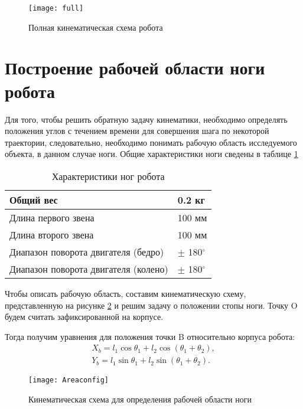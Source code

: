 \begin{figure}[h!]
	\begin{center}
		\texttt{[image: full]}
		\caption{Полная кинематическая схема робота}
		\label{full}
	\end{center}
\end{figure}

\section{Построение рабочей области ноги робота}\label{C2_2}
Для того, чтобы решить обратную задачу кинематики, необходимо определять положения углов с течением времени для совершения шага по некоторой траектории, следовательно, необходимо понимать рабочую область исследуемого объекта, в данном случае ноги. Общие характеристики ноги сведены в таблице \ref{tablParam}


\begin{table}[h]
	\begin{center}
		\caption{Характеристики ног робота}
		\label{tablParam}
		\begin{tabular}{| l | l |}
			\hline
			Общий вес   &    0.2 кг \\ \hline
			Длина первого звена & 100 мм\\ \hline
			Длина второго звена & 100 мм \\ \hline
			Диапазон поворота двигателя (бедро) & $\pm$ 180$^{\circ}$ \\ \hline
			Диапазон поворота двигателя (колено) & $\pm$ 180$^{\circ}$ \\ \hline
		\end{tabular}
	\end{center}
\end{table}

Чтобы описать рабочую область, составим кинематическую схему, представленную на рисунке \ref{Areaconfig} и решим задачу о положении стопы ноги. Точку O будем считать зафиксированной на корпусе. 

Тогда получим уравнения для положения точки B относительно корпуса робота:
\begin{equation}
\begin{array}{l}
	X_{b} = l_{1}\cos{\theta_1}+l_{2}\cos({\theta_1+\theta_2}),
	\\
	Y_{b} = l_{1}\sin{\theta_1}+l_{2}\sin({\theta_1+\theta_2}).
\end{array}
\end{equation}

\begin{figure}[h]
	\begin{center}
		\texttt{[image: Areaconfig]}
		\caption{Кинематическая схема для определения рабочей области ноги}
		\label{Areaconfig}
	\end{center}
\end{figure}

